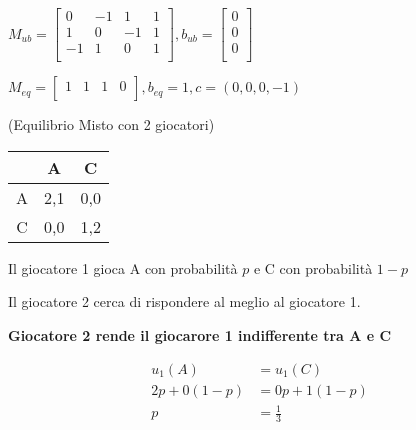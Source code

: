 \begin{center}
    
    $M_{ub} = \begin{bmatrix}
        0 & -1 & 1 & 1 \\
        1 & 0 & -1 & 1 \\
        -1 & 1 & 0 & 1 \\
    \end{bmatrix}, b_{ub} = \begin{bmatrix}
        0 \\
        0 \\
        0 \\
    \end{bmatrix}
    $

    $M_{eq} = \begin{bmatrix}
        1 & 1 & 1 & 0 \\
    \end{bmatrix}, b_{eq} = 1, c = (0,0,0,-1)$
\end{center}
    
    




\begin{esempio}(Equilibrio Misto con 2 giocatori)
\end{esempio}

\begin{table}[h]
    \begin{center}
        \begin{tabular}{|c|c|c|}
            \hline
              & A   & C   \\
            \hline
            A & 2,1 & 0,0 \\
            \hline
            C & 0,0 & 1,2 \\
            \hline
        \end{tabular}
    \end{center}
\end{table}

Il giocatore 1 gioca A con probabilità $p$ e C con probabilità $1-p$

Il giocatore 2 cerca di rispondere al meglio al giocatore 1.

\textbf{Giocatore 2 rende il giocarore 1 indifferente tra A e C}

\begin{equation}
    \begin{aligned}
        u_1(A)      & = u_1(C)      \\
        2p + 0(1-p) & = 0p + 1(1-p) \\
        p           & = \frac{1}{3}
    \end{aligned}
\end{equation}

